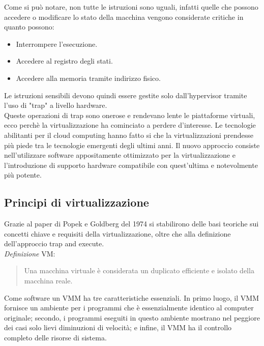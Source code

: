 \documentclass{article}
\begin{document}
		Come si può notare, non tutte le istruzioni sono uguali, infatti quelle che possono accedere o modificare lo stato della macchina vengono considerate critiche in quanto possono:
		\begin{itemize}
		    \item Interrompere l'esecuzione.
		    \item Accedere al registro degli stati.
		    \item Accedere alla memoria tramite indirizzo fisico.
		\end{itemize}
		Le istruzioni sensibili devono quindi essere gestite solo dall'hypervisor tramite l'uso di "trap" a livello hardware.\\
		
		Queste operazioni di trap sono onerose e rendevano lente le piattaforme virtuali, ecco perchè la virtualizzazione ha cominciato a perdere d'interesse. Le tecnologie abilitanti per il cloud computing hanno fatto si che la virtualizzazioni prendesse più piede tra le tecnologie emergenti degli ultimi anni. Il nuovo approccio consiste nell'utilizzare software appositamente ottimizzato per la virtualizzazione e l'introduzione di supporto hardware compatibile con quest'ultima e notevolmente più potente. 
		
		\subsection{Principi di virtualizzazione}
		Grazie al paper di Popek e Goldberg del 1974 si stabilirono delle basi teoriche sui concetti chiave e requisiti della virtualizzazione, oltre che alla definizione dell'approccio trap and execute.\\
		\emph{Definizione} VM: 
		\begin{quote}
			Una macchina virtuale è considerata un duplicato efficiente e isolato della macchina reale.
		\end{quote}
		Come software un VMM ha tre caratteristiche essenziali. In primo luogo, il VMM fornisce un ambiente per i programmi che è essenzialmente identico al computer originale; secondo, i programmi eseguiti in questo ambiente mostrano nel peggiore dei casi solo lievi diminuzioni di velocità; e infine, il VMM ha il controllo completo delle risorse di sistema.\\
		
\end{document}
